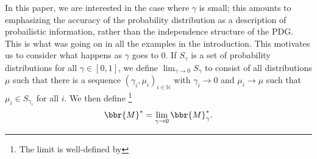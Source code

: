 \documentclass{article}
\theoremstyle{plain}
\theoremstyle{definition}
\theoremstyle{remark}
\numberwithin{equation}{section}
\begin{document}
In this paper, we are interested in the case where $\gamma$ is small;
this amounts to emphasizing the accuracy of the probability
distribution as a description of probailistic information, rather than
the independence structure of the PDG.  This is what was going on in
all the examples in the introduction.  This motivates us to consider
what happens as $\gamma$ goes to 0.  If $S_\gamma$ is a set of
probability distributions for all $\gamma \in [0,1]$, we define
$\lim_{\gamma \rightarrow 0} 
S_\gamma$ to consist of all distributions $\mu$ such that 
there is a sequence $(\gamma_i, \mu_i)_{i \in \mathbb N}$ with
$\gamma_i \to 0$ and $\mu_i \to \mu$ such that $\mu_i \in
S_{\gamma_i}$ for all $i$. 
We then define%
	\footnote{The limit is well-defined by }
\begin{equation*}
	\bbr{M}^* = \lim_{\gamma \rightarrow 0} \bbr{M}_\gamma^*.		
\end{equation*}
	
\end{document}
